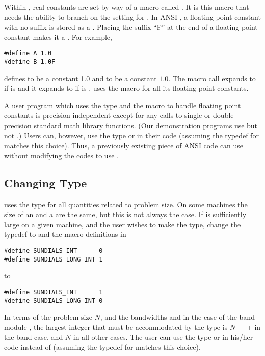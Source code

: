 Within {\sundials}, real constants are set by way of a macro called
.  It is this macro that needs the ability to branch on the
setting for .  In ANSI {\C}, a floating point constant with no
suffix is stored as a .  Placing the suffix ``F'' at the
end of a floating point constant makes it a . For example,
\begin{verbatim}
#define A 1.0
#define B 1.0F
\end{verbatim}
defines  to be a  constant 1.0 and  to be a
 constant $1.0$. The macro call 
expands to  if  is  and it expands to
 if  is . {\sundials} uses the  macro for
all its floating point constants. 

A user program which uses the type  and the  macro
to handle floating point constants is precision-independent except for
any calls to single or double precision standard math library
functions.  (Our demonstration programs use  but not
.)  Users can, however, use the type  or
 in their code (assuming the typedef for  matches
this choice).  Thus, a previously existing piece of ANSI {\C} code can use
{\sundials} without modifying the codes to use .

\subsection{Changing Type }

{\sundials} uses the type  for all quantities related to problem
size.  On some machines the size of an  and a 
are the same, but this is not always the case. 
If  is sufficiently large on a given machine, and the user wishes
to make  the  type, change the typedef
 to 
and the macro definitions in 
\begin{verbatim}
#define SUNDIALS_INT      0
#define SUNDIALS_LONG_INT 1
\end{verbatim}
to
\begin{verbatim}
#define SUNDIALS_INT      1
#define SUNDIALS_LONG_INT 0
\end{verbatim}
In terms of the problem size $N$, and the bandwidths  and  
in the case of the band module {\band}, the largest integer that must be 
accommodated by the  type is $N + $  +  in the 
band case, and $N$ in all other cases. The user can use the type  
or  in his/her code instead of  (assuming the 
typedef for  matches this choice).